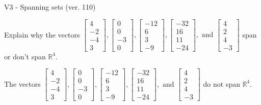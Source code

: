 \begin{exercise}
  \begin{exerciseTitle}V3 - Spanning sets (ver. 110)\end{exerciseTitle}
  \begin{exerciseStatement}
    Explain why the vectors \(\left[\begin{array}{r}
4 \\
-2 \\
-4 \\
3
\end{array}\right] , \left[\begin{array}{r}
0 \\
0 \\
-3 \\
0
\end{array}\right] , \left[\begin{array}{r}
-12 \\
6 \\
3 \\
-9
\end{array}\right] , \left[\begin{array}{r}
-32 \\
16 \\
11 \\
-24
\end{array}\right] , \text{ and } \left[\begin{array}{r}
4 \\
2 \\
4 \\
-3
\end{array}\right]\) span or don't span \(\mathbb{R}^4\). 
	


  \end{exerciseStatement}
  \begin{exerciseAnswer}
   The vectors \(\left[\begin{array}{r}
4 \\
-2 \\
-4 \\
3
\end{array}\right] , \left[\begin{array}{r}
0 \\
0 \\
-3 \\
0
\end{array}\right] , \left[\begin{array}{r}
-12 \\
6 \\
3 \\
-9
\end{array}\right] , \left[\begin{array}{r}
-32 \\
16 \\
11 \\
-24
\end{array}\right] , \text{ and } \left[\begin{array}{r}
4 \\
2 \\
4 \\
-3
\end{array}\right]\) 
  	 do not  
	span \(\mathbb{R}^4\).
  



\end{exerciseAnswer}
\end{exercise}
